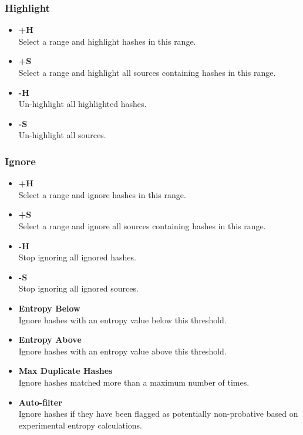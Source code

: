 \documentclass[11pt,fleqn]{article} %
\begin{document}
\subsubsection{Highlight}
\begin{itemize}
\item \textbf{+H}\\
Select a range and highlight hashes in this range.
\item \textbf{+S}\\
 Select a range and highlight all sources containing hashes in this range.
\item \textbf{-H}\\
Un-highlight all highlighted hashes.
\item \textbf{-S}\\
Un-highlight all sources.
\end{itemize}

\subsubsection{Ignore}
\begin{itemize}
\item \textbf{+H}\\
Select a range and ignore hashes in this range.
\item \textbf{+S}\\
Select a range and ignore all sources containing hashes in this range.
\item \textbf{-H}\\
Stop ignoring all ignored hashes.
\item \textbf{-S}\\
Stop ignoring all ignored sources.
\item \textbf{Entropy Below}\\
Ignore hashes with an entropy value below this threshold.
\item \textbf{Entropy Above}\\
Ignore hashes with an entropy value above this threshold.
\item \textbf{Max Duplicate Hashes}\\
Ignore hashes matched more than a maximum number of times.
\item \textbf{Auto-filter}\\
Ignore hashes if they have been flagged as potentially non-probative based on experimental entropy calculations.
\end{itemize}
\end{document}
